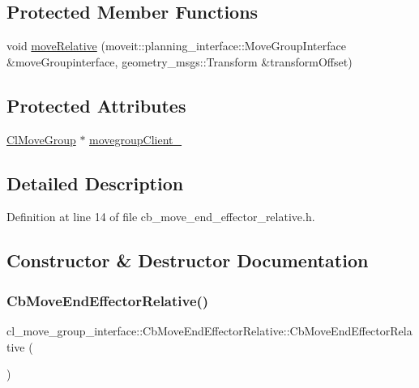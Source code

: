 \subsection*{Protected Member Functions}
\begin{DoxyCompactItemize}
\item 
void \hyperlink{classcl__move__group__interface_1_1CbMoveEndEffectorRelative_ab9498fefa83f46b974ce5b13df7dbd16}{move\+Relative} (moveit\+::planning\+\_\+interface\+::\+Move\+Group\+Interface \&move\+Groupinterface, geometry\+\_\+msgs\+::\+Transform \&transform\+Offset)
\end{DoxyCompactItemize}
\subsection*{Protected Attributes}
\begin{DoxyCompactItemize}
\item 
\hyperlink{classcl__move__group__interface_1_1ClMoveGroup}{Cl\+Move\+Group} $\ast$ \hyperlink{classcl__move__group__interface_1_1CbMoveEndEffectorRelative_ae742e6382bfb47fd9e1458bd6c8d3255}{movegroup\+Client\+\_\+}
\end{DoxyCompactItemize}


\subsection{Detailed Description}


Definition at line 14 of file cb\+\_\+move\+\_\+end\+\_\+effector\+\_\+relative.\+h.



\subsection{Constructor \& Destructor Documentation}
\mbox{\label{classcl__move__group__interface_1_1CbMoveEndEffectorRelative_ae19432476127e8dcfcd9066d86232fbd}} 
\subsubsection{\texorpdfstring{Cb\+Move\+End\+Effector\+Relative()}{CbMoveEndEffectorRelative()}\hspace{0.1cm}{\footnotesize\ttfamily [1/2]}}
{\footnotesize\ttfamily cl\+\_\+move\+\_\+group\+\_\+interface\+::\+Cb\+Move\+End\+Effector\+Relative\+::\+Cb\+Move\+End\+Effector\+Relative (\begin{DoxyParamCaption}{ }\end{DoxyParamCaption})}



